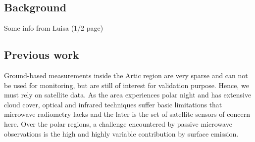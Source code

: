 \documentclass[12pt,oneside,a4paper]{article}
\begin{document}


\subsection{Background}
%
\label{sec:background}
Some info from Luisa (1/2 page)

\subsection{Previous work}
%
\label{sec:previousworks}
%
Ground-based measurements inside the Artic region are very sparse and can not
be used for monitoring, but are still of interest for validation purpose.
Hence, we must rely on satellite data. As the area experiences polar night and
has extensive cloud cover, optical and infrared techniques suffer basic
limitations that microwave radiometry lacks and the later is the set of
satellite sensors of concern here. Over the polar regions, a challenge
encountered by passive microwave observations is the high and highly variable
contribution by surface emission. 
\end{document}
